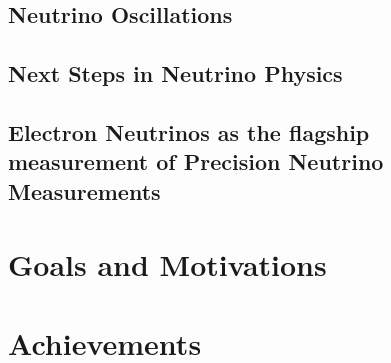\subsection{Neutrino Oscillations}


\subsection{Next Steps in Neutrino Physics}

\subsection{Electron Neutrinos as the flagship measurement of Precision Neutrino Measurements}

\section{Goals and Motivations}

\section{Achievements}








